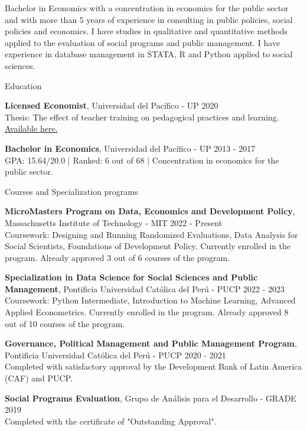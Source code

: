 \documentclass{resume} %
\begin{document}
\item {Bachelor in Economics with a concentration in economics for the public sector and with more than 5 years of experience in consulting in public policies, social policies and economics. I have studies in qualitative and quantitative methods applied to the evaluation of social programs and public management. I have experience in database management in STATA, R and Python applied to social sciences.}


\begin{rSection}{Education}

{\bf Licensed Economist}, Universidad del Pacífico - UP \hfill {2020} \\
Thesis: The effect of teacher training on pedagogical practices and learning. \href{https://repositorio.up.edu.pe/handle/11354/2653}{Available here.}

{\bf Bachelor in Economics}, Universidad del Pacífico - UP \hfill {2013 - 2017}\\
GPA: 15.64/20.0 | Ranked: 6 out of 68 | Concentration in economics for the public sector.

\end{rSection}


\begin{rSection}{Courses and Specialization programs}

{\bf MicroMasters Program on Data, Economics and Development Policy}, Massachusetts Institute of Technology - MIT \hfill {2022 - Present}\\
Coursework: Designing and Running Randomized Evaluations, Data Analysis for Social Scientists, Foundations of Development Policy.
Currently enrolled in the program. Already approved 3 out of 6 courses of the program.

{\bf Specialization in Data Science for Social Sciences and Public Management}, Pontificia Universidad Católica del Perú - PUCP \hfill {2022 - 2023}\\
Coursework: Python Intermediate, Introduction to Machine Learning, Advanced Applied Econometrics.
Currently enrolled in the program. Already approved 8 out of 10 courses of the program.

{\bf Governance, Political Management and Public Management Program}, Pontificia Universidad Católica del Perú - PUCP \hfill {2020 - 2021}\\
Completed with satisfactory approval by the Development Bank of Latin America (CAF) and PUCP. 

{\bf Social Programs Evaluation}, Grupo de Análisis para el Desarrollo - GRADE \hfill {2019}\\
Completed with the certificate of "Outstanding Approval". 
\end{rSection}
\end{document}
